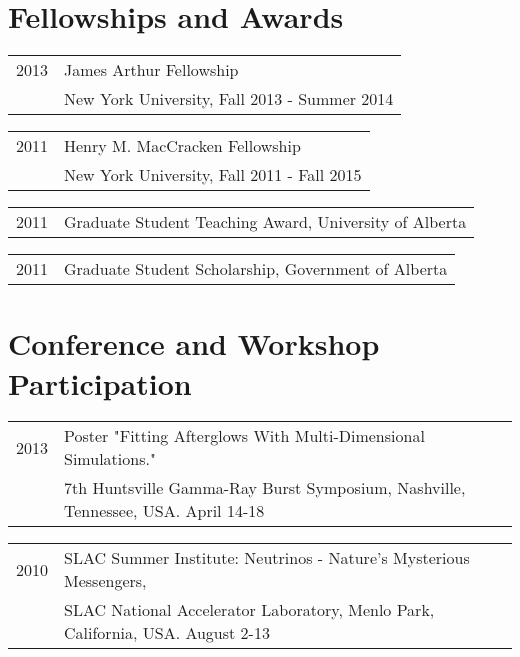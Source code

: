 \documentclass[letterpaper]{article}
\renewenvironment{itemize}{
  \begin{list}{}{
    \setlength{\leftmargin}{-0.5em}
  }
}{
  \end{list}
}
\begin{document}
\section*{Fellowships and Awards}
\begin{itemize}
\item \begin{tabular}{ll}
2013 & James Arthur Fellowship \\
& New York University, Fall 2013 - Summer 2014 \\
\end{tabular}

\item \begin{tabular}{ll}
2011 & Henry M. MacCracken Fellowship \\
& New York University, Fall 2011 - Fall 2015 \\
\end{tabular}

\item \begin{tabular}{ll}
2011 & Graduate Student Teaching Award, University of Alberta \\
\end{tabular}

\item \begin{tabular}{ll}
2011 & Graduate Student Scholarship, Government of Alberta \\
\end{tabular}
\end{itemize}


\section*{Conference and Workshop Participation}
\begin{itemize}
\item \begin{tabular}{ll}
2013 & Poster "Fitting Afterglows With Multi-Dimensional Simulations." \\ 
	&7th Huntsville Gamma-Ray Burst Symposium, Nashville, Tennessee, USA.  April 14-18 
\end{tabular}
\item \begin{tabular}{ll}
2010 & SLAC Summer Institute: Neutrinos - Nature's Mysterious Messengers, \\ 
	 & SLAC National Accelerator Laboratory, Menlo Park, California, USA.  August 2-13
\end{tabular}
\end{itemize}
\end{document}
